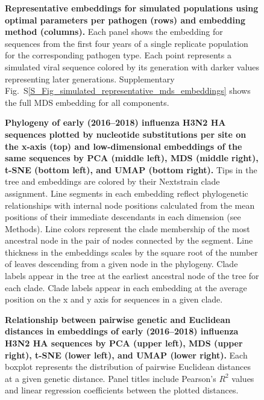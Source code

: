 \documentclass[webpdf,contemporary,large,single]{oup-authoring-template}%
\theoremstyle{thmstyleone}%
\theoremstyle{thmstyletwo}%
\theoremstyle{thmstylethree}%
\begin{document}
\begin{figure}[H]
\caption{{\bf Representative embeddings for simulated populations using optimal parameters per pathogen (rows) and embedding method (columns).}
  Each panel shows the embedding for sequences from the first four years of a single replicate population for the corresponding pathogen type.
  Each point represents a simulated viral sequence colored by its generation with darker values representing later generations.
  Supplementary Fig.~S\ref{S_Fig_simulated_representative_mds_embeddings} shows the full MDS embedding for all components.}\label{fig:simulated-populations-representative-embeddings}
\end{figure}

\begin{figure}[H]
\caption{{\bf Phylogeny of early (2016--2018) influenza H3N2 HA sequences plotted by nucleotide substitutions per site on the x-axis (top) and low-dimensional embeddings of the same sequences by PCA (middle left), MDS (middle right), t-SNE (bottom left), and UMAP (bottom right).}
  Tips in the tree and embeddings are colored by their Nextstrain clade assignment.
  Line segments in each embedding reflect phylogenetic relationships with internal node positions calculated from the mean positions of their immediate descendants in each dimension (see Methods).
  Line colors represent the clade membership of the most ancestral node in the pair of nodes connected by the segment.
  Line thickness in the embeddings scales by the square root of the number of leaves descending from a given node in the phylogeny.
  Clade labels appear in the tree at the earliest ancestral node of the tree for each clade.
  Clade labels appear in each embedding at the average position on the x and y axis for sequences in a given clade.
}\label{fig:seasonal-influenza-h3n2-ha-embeddings}
\end{figure}

\begin{figure}[H]
\caption{{\bf Relationship between pairwise genetic and Euclidean distances in embeddings of early (2016--2018) influenza H3N2 HA sequences by PCA (upper left), MDS (upper right), t-SNE (lower left), and UMAP (lower right).}
  Each boxplot represents the distribution of pairwise Euclidean distances at a given genetic distance.
  Panel titles include Pearson's $R^{2}$ values and linear regression coefficients between the plotted distances.
}\label{fig:seasonal-influenza-h3n2-ha-pairwise-distances}
\end{figure}
\end{document}
